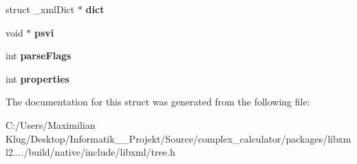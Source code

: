 \begin{DoxyCompactItemize}
struct \+\_\+xml\+Dict $\ast$ {\bfseries dict}
\item 
\mbox{\label{struct__xml_doc_af22a189e5ec5b98d7992cac8ef3dbb38}} 
void $\ast$ {\bfseries psvi}
\item 
\mbox{\label{struct__xml_doc_a90811644cebded116c22868c9397a1ca}} 
int {\bfseries parse\+Flags}
\item 
\mbox{\label{struct__xml_doc_a9d5825f815564d4bf531fe5be8af7767}} 
int {\bfseries properties}
\end{DoxyCompactItemize}


The documentation for this struct was generated from the following file\+:\begin{DoxyCompactItemize}
\item 
C\+:/\+Users/\+Maximilian Klug/\+Desktop/\+Informatik\+\_\+\_\+\+Projekt/\+Source/complex\+\_\+calculator/packages/libxml2..../build/native/include/libxml/tree.\+h\end{DoxyCompactItemize}
